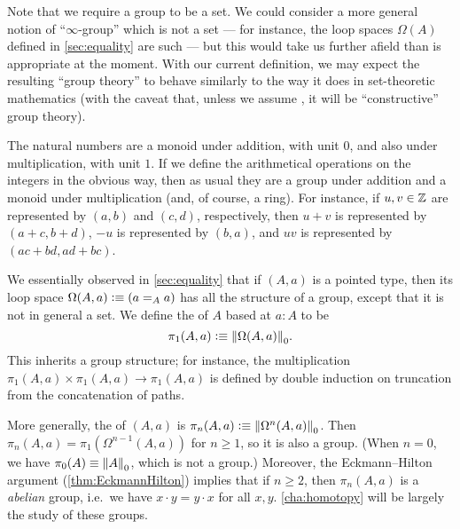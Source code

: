 \begin{rmk}
Note that we require a group to be a set.
We could consider a more general notion of ``$\infty$-group'' which is not a set --- for instance, the loop spaces $\Omega(A)$ defined in \autoref{sec:equality} are such --- but this would take us further afield than is appropriate at the moment.
With our current definition, we may expect the resulting ``group theory'' to behave similarly to the way it does in set-theoretic mathematics (with the caveat that, unless we assume \LEM{}, it will be ``constructive'' group theory).
\end{rmk}

\begin{eg}
  The natural numbers \N are a monoid under addition, with unit $0$, and also under multiplication, with unit $1$.
  If we define the arithmetical operations on the integers \Z in the obvious way, then as usual they are a group under addition and a monoid under multiplication (and, of course, a ring).
  For instance, if $u, v \in \Z$ are represented by $(a,b)$ and $(c,d)$, respectively, then $u + v$ is represented by $(a + c, b + d)$, $-u$ is represented by $(b, a)$, and $u v$ is represented by $(a c + b d, a d + b c)$.
\end{eg}

\begin{eg}\label{thm:homotopy-groups}
  We essentially observed in \autoref{sec:equality} that if $(A,a)$ is a pointed type, then its loop space $\Omega(A,a)\defeq (\id[A]aa)$ has all the structure of a group, except that it is not in general a set.
  We define the  of $A$ based at $a:A$ to be
  \[\pi_1(A,a)\defeq \trunc0{\Omega(A,a)}.\]
  This inherits a group structure; for instance, the multiplication $\pi_1(A,a) \times \pi_1(A,a) \to \pi_1(A,a)$ is defined by double induction on truncation from the concatenation of paths.

  More generally, the  of $(A,a)$ is $\pi_n(A,a)\defeq \trunc0{\Omega^n(A,a)}$.
  Then $\pi_n(A,a) = \pi_1(\Omega^{n-1}(A,a))$ for $n\ge 1$, so it is also a group.
  (When $n=0$, we have $\pi_0(A) \jdeq \trunc0 A$, which is not a group.)
  Moreover, the Eckmann--Hilton argument (\autoref{thm:EckmannHilton}) implies that if $n\ge 2$, then $\pi_n(A,a)$ is a \emph{abelian} group, i.e.\ we have $x\cdot y = y\cdot x$ for all $x,y$.
  \autoref{cha:homotopy} will be largely the study of these groups.
\end{eg}

